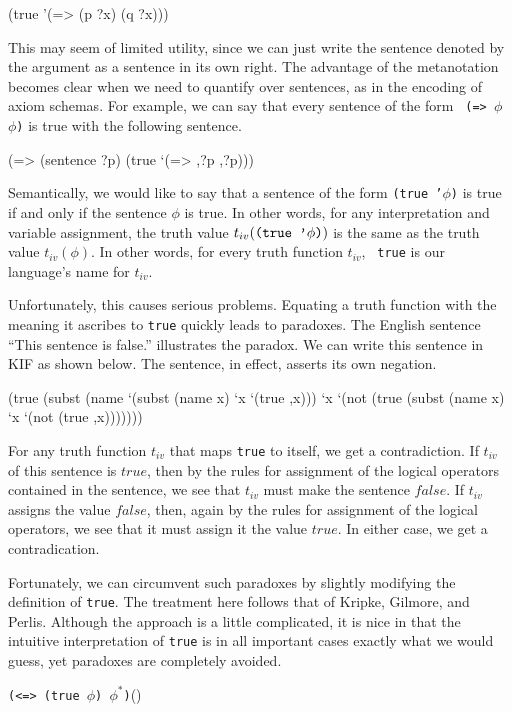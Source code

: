 \medskip
\beginverbatim
(true '(=> (p ?x) (q ?x)))
\endverbatim
\medskip

This may seem of limited utility, since we can just write the sentence denoted by
the argument as a sentence in its own right.  The advantage of the metanotation
becomes clear when we need to quantify over sentences, as in the encoding of axiom
schemas.  For example, we can say that every sentence of the form {\tt
(=> $\phi$ $\phi$)} is true with the following sentence.

\medskip
\beginverbatim
(=> (sentence ?p) (true `(=> ,?p ,?p)))
\endverbatim
\medskip

Semantically, we would like to say that a sentence of the form {\tt (true
'$\phi$)} is true if and only if the sentence $\phi$ is true.  In other
words, for any interpretation and variable assignment, the truth value
$t_{iv}(\hbox{\tt (true '$\phi$)})$ is the same as the truth value
$t_{iv}(\phi)$.  In other words, for every truth function $t_{iv}$, {\tt
true} is our language's name for $t_{iv}$.

Unfortunately, this causes serious problems.  Equating a truth function with
the meaning it ascribes to {\tt true} quickly leads to paradoxes.  The
English sentence ``This sentence is false.'' illustrates the paradox.  We
can write this sentence in KIF as shown below.  The sentence, in effect,
asserts its own negation.

\medskip
\beginverbatim
(true (subst (name `(subst (name x) `x `(true ,x)))
             `x
             `(not (true (subst (name x) `x `(not (true ,x)))))))
\endverbatim
\medskip

For any truth function $t_{iv}$ that maps {\tt true} to itself, we get a
contradiction.  If $t_{iv}$ of this sentence is $true$, then by the
rules for assignment of the logical operators contained in the sentence, we see
that $t_{iv}$ must make the sentence $false$.  If $t_{iv}$ assigns the value
$false$, then, again by the rules for assignment of the logical operators, we
see that it must assign it the value $true$.  In either case, we get a
contradication.

Fortunately, we can circumvent such paradoxes by slightly modifying the
definition of {\tt true}.  The treatment here follows that of Kripke,
Gilmore, and Perlis.  Although the approach is a little complicated, it
is nice in that the intuitive interpretation of {\tt true} is in all
important cases exactly what we would guess, yet paradoxes are completely
avoided.

\medskip
{\tt (<=> (true $\phi$) $\phi^*$)}\hfill(\equation)\par
\medskip

